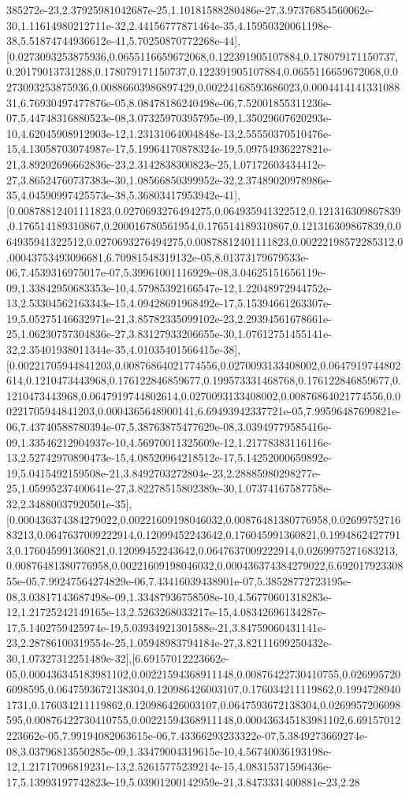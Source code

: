 \documentclass{article}
\begin{document}
385272e-23,2.37925981042687e-25,1.10181588280486e-27,3.97376854560062e-30,1.11614980212711e-32,2.44156777871464e-35,4.15950320061198e-38,5.51874744936612e-41,5.70250870772268e-44],[0.0273093253875936,0.0655116659672068,0.122391905107884,0.178079171150737,0.20179013731288,0.178079171150737,0.122391905107884,0.0655116659672068,0.0273093253875936,0.00886603986897429,0.00224168593686023,0.000441414133108831,6.76930497477876e-05,8.08478186240498e-06,7.52001855311236e-07,5.44748316880523e-08,3.07325970395795e-09,1.35029607620293e-10,4.62045908912903e-12,1.23131064004848e-13,2.55550370510476e-15,4.13058703074987e-17,5.19964170878324e-19,5.09754936227821e-21,3.89202696662836e-23,2.3142838300823e-25,1.07172603434412e-27,3.86524760737383e-30,1.08566850399952e-32,2.37489020978986e-35,4.04590997425573e-38,5.36803417953942e-41],[0.00878812401111823,0.0270693276494275,0.064935941322512,0.121316309867839,0.176514189310867,0.200016780561954,0.176514189310867,0.121316309867839,0.064935941322512,0.0270693276494275,0.00878812401111823,0.00222198572285312,0.00043753493096681,6.70981548319132e-05,8.01373179679533e-06,7.4539316975017e-07,5.39961001116929e-08,3.04625151656119e-09,1.33842950683353e-10,4.57985392166547e-12,1.22048972944752e-13,2.53304562163343e-15,4.09428691968492e-17,5.15394661263307e-19,5.05275146632971e-21,3.85782335099102e-23,2.29394561678661e-25,1.06230757304836e-27,3.83127933206655e-30,1.07612751455141e-32,2.35401938011344e-35,4.01035401566415e-38],[0.00221705944841203,0.00876864021774556,0.0270093133408002,0.0647919744802614,0.1210473443968,0.176122846859677,0.199573331468768,0.176122846859677,0.1210473443968,0.0647919744802614,0.0270093133408002,0.00876864021774556,0.00221705944841203,0.0004365648900141,6.69493942337721e-05,7.99596487699821e-06,7.43740588780394e-07,5.38763875477629e-08,3.03949779585416e-09,1.33546212904937e-10,4.56970011325609e-12,1.21778383116116e-13,2.52742970890473e-15,4.08520964218512e-17,5.14252000659892e-19,5.0415492159508e-21,3.8492703272804e-23,2.28885980298277e-25,1.05995237400641e-27,3.82278515802389e-30,1.07374167587758e-32,2.34880037920501e-35],[0.000436374384279022,0.00221609198046032,0.00876481380776958,0.0269975271683213,0.0647637009222914,0.12099452243642,0.176045991360821,0.19948624277913,0.176045991360821,0.12099452243642,0.0647637009222914,0.0269975271683213,0.00876481380776958,0.00221609198046032,0.000436374384279022,6.69201792330855e-05,7.99247564274829e-06,7.43416039438901e-07,5.38528772723195e-08,3.03817143687498e-09,1.33487936758508e-10,4.56770601318283e-12,1.21725242149165e-13,2.5263268033217e-15,4.08342696134287e-17,5.1402759425974e-19,5.03934921301588e-21,3.84759060431141e-23,2.28786100319554e-25,1.05948983794184e-27,3.82111699250432e-30,1.07327312251489e-32],[6.69157012223662e-05,0.000436345183981102,0.00221594368911148,0.00876422730410755,0.0269957206098595,0.0647593672138304,0.120986426003107,0.176034211119862,0.19947289401731,0.176034211119862,0.120986426003107,0.0647593672138304,0.0269957206098595,0.00876422730410755,0.00221594368911148,0.000436345183981102,6.69157012223662e-05,7.99194082063615e-06,7.43366293233322e-07,5.3849273669274e-08,3.03796813550285e-09,1.33479004319615e-10,4.56740036193198e-12,1.21717096819231e-13,2.52615775239214e-15,4.08315371596436e-17,5.13993197742823e-19,5.03901200142959e-21,3.8473331400881e-23,2.28
\end{document}
